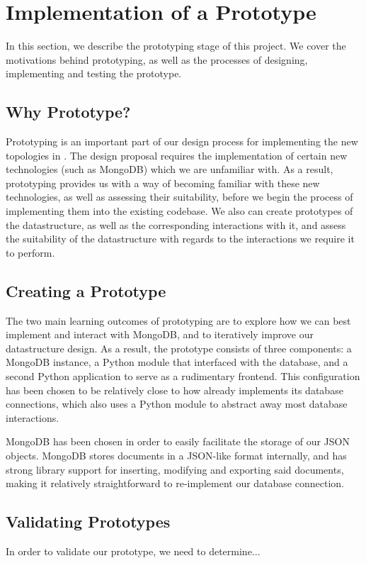 \documentclass[11pt]{article}
\begin{document}
\section{Implementation of a Prototype} \label{sec:implementation}
	In this section, we describe the prototyping stage of this project.
	We cover the motivations behind prototyping, as well as the processes of designing, implementing and testing the prototype.
	\subsection{Why Prototype?}
		Prototyping is an important part of our design process for implementing the new topologies in \opendc{}.
		The design proposal requires the implementation of certain new technologies (such as MongoDB) which we are unfamiliar with.
		As a result, prototyping provides us with a way of becoming familiar with these new technologies, as well as assessing their suitability, before we begin the process of implementing them into the existing \opendc{} codebase.
		We also can create prototypes of the datastructure, as well as the corresponding interactions with it, and assess the suitability of the datastructure with regards to the interactions we require it to perform.
	
	\subsection{Creating a Prototype}
		The two main learning outcomes of prototyping are to explore how we can best implement and interact with MongoDB, and to iteratively improve our datastructure design.
		As a result, the prototype consists of three components: a MongoDB instance, a Python module that interfaced with the database, and a second Python application to serve as a rudimentary frontend. 
		This configuration has been chosen to be relatively close to how \opendc{} already implements its database connections, which also uses a Python module to abstract away most database interactions.

		MongoDB has been chosen in order to easily facilitate the storage of our JSON objects.
		MongoDB stores documents in a JSON-like format internally, and has strong library support for inserting, modifying and exporting said documents, making it relatively straightforward to re-implement our database connection.

	\subsection{Validating Prototypes}
		In order to validate our prototype, we need to determine...
\end{document}

